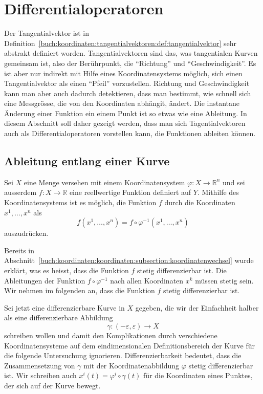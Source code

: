 %
%
%
\section{Differentialoperatoren
\label{buch:koordinaten:section:differentialoperatoren}}
Der Tangentialvektor ist in
Definition~\ref{buch:koordinaten:tangentialvektoren:def:tangentialvektor}
sehr abstrakt definiert worden.
Tangentialvektoren sind das, was tangentialen Kurven gemeinsam ist,
also der Berührpunkt, die ``Richtung'' und ``Geschwindigkeit''.
Es ist aber nur indirekt mit Hilfe eines Koordinatensystems möglich, sich 
einen Tangentialvektor als einen ``Pfeil'' vorzustellen.
Richtung und Geschwindigkeit kann man aber auch dadurch detektieren, dass
man bestimmt, wie schnell sich eine Messgrösse, die von den Koordinaten
abhängit, ändert.
Die instantane Änderung einer Funktion ein einem Punkt ist so etwas
wie eine Ableitung.
In diesem Abschnitt soll daher gezeigt werden, dass man sich
Tagentialvektoren auch als Differentialoperatoren vorstellen
kann, die Funktionen ableiten können.

%
%
\subsection{Ableitung entlang einer Kurve}
Sei $X$ eine Menge versehen mit einem Koordinatensystem
$\varphi\colon X\to \mathbb{R}^n$ und sei ausserdem 
$f\colon X\to\mathbb{R}$ eine reellwertige Funktion definiert
auf $Y$.
Mithilfe des Koordinatensystems ist es möglich, die Funktion $f$
durch die Koordinaten $x^1,\dots,x^n$ als
\[
f(x^1,\dots,x^n) = f\circ\varphi^{-1} (x^1,\dots,x^n)
\]
auszudrücken.

Bereits in
Abschnitt~\ref{buch:koordinaten:koordinaten:subsection:koordinatenwechsel}
wurde erklärt, was es heisst, dass die Funktion $f$ stetig differenzierbar
ist.
Die Ableitungen der Funktion $f\circ\varphi^{-1}$ nach allen Koordinaten
$x^k$ müssen stetig sein.
Wir nehmen im folgenden an, dass die Funktion $f$ stetig differenzierbar
ist.

Sei jetzt eine differenzierbare Kurve in $X$ gegeben, die wir
der Einfachheit halber als eine differenzierbare Abbildung
\[
\gamma\colon (-\varepsilon,\varepsilon) \to X
\]
schreiben wollen und damit den Komplikationen durch verschiedene
Koordinatensysteme auf dem eindimensionalen Definitionsbereich der
Kurve für die folgende Untersuchung ignorieren.
Differenzierbarkeit bedeutet, dass die Zusammensetzung von $\gamma$
mit der Koordinatenabbildung $\varphi$ stetig differenzierbar ist.
Wir schreiben auch $x^i(t) = \varphi^i\circ\gamma(t)$ für die Koordinaten
eines Punktes, der sich auf der Kurve bewegt.

